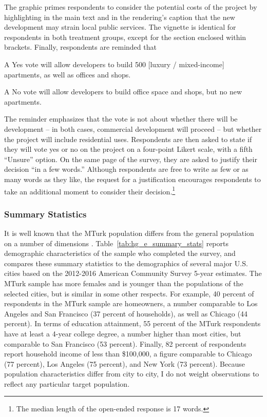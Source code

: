 \documentclass[article,12pt]{memoir}
\begin{document}
The graphic primes respondents to consider the potential costs of the project by highlighting in the main text and in the rendering's caption that the new development may strain local public services. The vignette is identical for respondents in both treatment groups, except for the section enclosed within brackets.  Finally, respondents are reminded that
  \begin{itemize}
  \begin{SingleSpace}
    \item A Yes vote will allow developers to build 500 [luxury / mixed-income] apartments, as well as offices and shops.
    \item A No vote will allow developers to build office space and shops, but no new apartments.\end{SingleSpace}
  \end{itemize}

\noindent The reminder emphasizes that the vote is not about whether there will be development -- in both cases, commercial development will proceed -- but whether the project will include residential uses.  Respondents are then asked to state if they will vote yes or no on the project on a four-point Likert scale, with a fifth ``Unsure'' option.  On the same page of the survey, they are asked to justify their decision ``in a few words.'' Although respondents are free to write as few or as many words as they like, the request for a justification encourages respondents to take an additional moment to consider their decision.\footnote{The median length of the open-ended response is 17 words.}

\subsubsection{Summary Statistics}

It is well known that the MTurk population differs from the general population on a number of dimensions \citep[see e.g.][]{huff_who_2015}.  Table~\ref{tab:hg_e_summary_stats} reports demographic characteristics of the sample who completed the survey, and compares these summary statistics to the demographics of several major U.S. cities based on the 2012-2016 American Community Survey 5-year estimates.  The MTurk sample has more females and is younger than the populations of the selected cities, but is similar in some other respects. For example, 40 percent of respondents in the MTurk sample are homeowners, a number comparable to Los Angeles and San Francisco (37 percent of households), as well as Chicago (44 percent).  In terms of education attainment, 55 percent of the MTurk respondents have at least a 4-year college degree, a number higher than most cities, but comparable to San Francisco (53 percent).  Finally, 82 percent of respondents report household income of less than \$100,000, a figure comparable to Chicago (77 percent), Los Angeles (75 percent), and New York (73 percent). Because population characteristics differ from city to city, I do not weight observations to reflect any particular target population.
\end{document}
